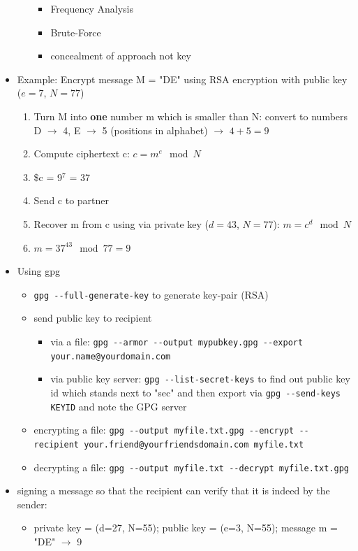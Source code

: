 \documentclass[11pt]{article}
\begin{document}
\begin{itemize}
\begin{itemize}
\begin{itemize}
\item Frequency Analysis
\item Brute-Force
\item concealment of approach not key
\end{itemize}
\end{itemize}
\item Example: Encrypt message M = "DE" using RSA encryption with public key (\(e=7\), \(N=77\))
\begin{enumerate}
\item Turn M into \textbf{one} number m which is smaller than N: convert to numbers D \(\rightarrow\) 4, E \(\rightarrow\) 5 (positions in alphabet) \(\rightarrow\) \(4+5 =9\)
\item Compute ciphertext c: \(c = m^e \mod N\)
\item \$c = 9\(^{\text{7}}\)  = 37
\item Send c to partner
\item Recover m from c using via private key (\(d=43\), \(N=77\)): \(m=c^d \mod N\)
\item \(m = 37^43 \mod 77 = 9\)
\end{enumerate}
\item Using gpg
\begin{itemize}
\item \texttt{gpg -{}-full-generate-key} to generate key-pair (RSA)
\item send public key to recipient 
\begin{itemize}
\item via a file: \texttt{gpg -{}-armor -{}-output mypubkey.gpg -{}-export your.name@yourdomain.com}
\item via public key server: \texttt{gpg -{}-list-secret-keys} to find out public key id which stands next to "sec" and then export via \texttt{gpg -{}-send-keys KEYID} and note the GPG server
\end{itemize}
\item encrypting a file: \texttt{gpg -{}-output myfile.txt.gpg -{}-encrypt -{}-recipient your.friend@yourfriendsdomain.com  myfile.txt}
\item decrypting a file: \texttt{gpg -{}-output myfile.txt -{}-decrypt myfile.txt.gpg}
\end{itemize}
\item signing a message so that the recipient can verify that it is indeed by the sender:
\begin{itemize}
\item private key = (d=27, N=55); public key = (e=3, N=55); message m = "DE" \(\rightarrow\) 9

\end{itemize}
\end{itemize}
\end{document}
